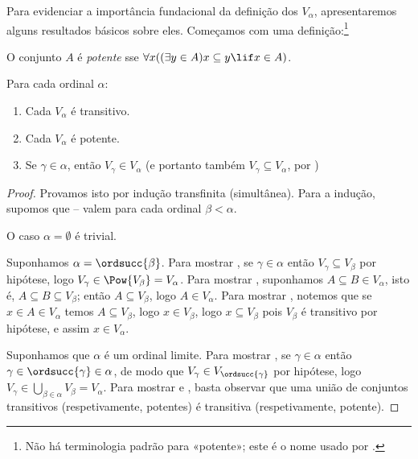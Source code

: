\documentclass[../../../include/open-logic-section]{subfiles}
\begin{document}

Para evidenciar a importância fundacional da definição dos
$V_\alpha$, apresentaremos alguns resultados básicos sobre eles. Começamos com uma definição:\footnote{Não há terminologia padrão para «potente»; este é o nome usado por \citet{ButtonLT1}.}
\begin{defn}
	O conjunto $A$ é \emph{potente} sse $\forall x((\exists y \in A)x \subseteq y \lif x \in A)$. 
\end{defn}
\begin{lem}
Para cada ordinal $\alpha$:
\begin{enumerate}
	\item{} Cada $V_\alpha$ é transitivo.
	\item{} Cada $V_\alpha$ é potente.
	\item{} Se $\gamma \in \alpha$, então $V_\gamma
	\in V_\alpha$ (e portanto também $V_\gamma \subseteq V_\alpha$, por
	)
\end{enumerate}
\end{lem}

\begin{proof}
Provamos isto por indução transfinita (simultânea). Para a
indução, supomos que -- valem
para cada ordinal $\beta < \alpha$. 

O caso $\alpha = \emptyset$ é trivial. 

Suponhamos $\alpha = \ordsucc{\beta}$. Para mostrar , se
$\gamma \in \alpha$ então $V_\gamma \subseteq V_\beta$ por hipótese,
logo $V_\gamma \in \Pow{V_\beta} = V_\alpha$. Para mostrar
, suponhamos $A \subseteq B \in V_\alpha$, isto é, $A
\subseteq B \subseteq V_\beta$; então $A \subseteq V_\beta$, logo $A \in
V_\alpha$. Para mostrar , notemos que se $x \in A \in
V_\alpha$ temos $A \subseteq V_\beta$, logo $x \in V_\beta$, logo $x
\subseteq V_\beta$ pois $V_\beta$ é transitivo por hipótese, e assim $x
\in V_\alpha$. 

Suponhamos que $\alpha$ é um ordinal limite. Para mostrar , se
$\gamma \in \alpha$ então $\gamma \in \ordsucc{\gamma} \in \alpha$, de modo que
$V_\gamma \in V_{\ordsucc{\gamma}}$ por hipótese, logo
$V_\gamma \in \bigcup_{\beta \in \alpha} V_\beta = V_\alpha$. Para mostrar
 e , basta observar que uma
união de conjuntos transitivos (respetivamente, potentes) é transitiva
(respetivamente, potente). 
\end{proof}
\end{document}
